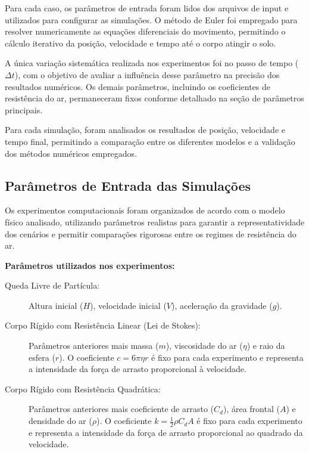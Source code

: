 Para cada caso, os parâmetros de entrada foram lidos dos arquivos de input e utilizados para configurar as simulações. O método de Euler foi empregado para resolver numericamente as equações diferenciais do movimento, permitindo o cálculo iterativo da posição, velocidade e tempo até o corpo atingir o solo.

A única variação sistemática realizada nos experimentos foi no passo de tempo ($\Delta t$), com o objetivo de avaliar a influência desse parâmetro na precisão dos resultados numéricos. Os demais parâmetros, incluindo os coeficientes de resistência do ar, permaneceram fixos conforme detalhado na seção de parâmetros principais.

Para cada simulação, foram analisados os resultados de posição, velocidade e tempo final, permitindo a comparação entre os diferentes modelos e a validação dos métodos numéricos empregados.

\subsection{Parâmetros de Entrada das Simulações}
\label{sec_parametros_entrada}

Os experimentos computacionais foram organizados de acordo com o modelo físico analisado, utilizando parâmetros realistas para garantir a representatividade dos cenários e permitir comparações rigorosas entre os regimes de resistência do ar.

\textbf{Parâmetros utilizados nos experimentos:}
\begin{description}
    \item[Queda Livre de Partícula:] Altura inicial ($H$), velocidade inicial ($V$), aceleração da gravidade ($g$).\\
    
    \item[Corpo Rígido com Resistência Linear (Lei de Stokes):] Parâmetros anteriores mais massa ($m$), viscosidade do ar ($\eta$) e raio da esfera ($r$). O coeficiente $c = 6\pi\eta r$ é fixo para cada experimento e representa a intensidade da força de arrasto proporcional à velocidade.\\
    
    \item[Corpo Rígido com Resistência Quadrática:] Parâmetros anteriores mais coeficiente de arrasto ($C_d$), área frontal ($A$) e densidade do ar ($\rho$). O coeficiente $k = \frac{1}{2} \rho C_d A$ é fixo para cada experimento e representa a intensidade da força de arrasto proporcional ao quadrado da velocidade.\\
    
\end{description}

